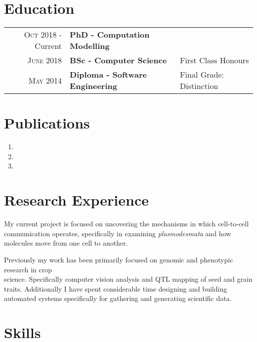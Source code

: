 \documentclass[a4paper,10pt]{article}
\begin{document}
\section{Education}
\begin{tabular}{rll}

  \textsc{Oct} 2018 - Current & \textbf{PhD - Computation Modelling} &   \\

  \textsc{June} 2018  & \textbf{BSc - Computer Science} & First Class Honours \\

  \textsc{May} 2014& \textbf{Diploma - Software Engineering} & Final Grade: Distinction

\end{tabular}


\section{Publications}

\begin{enumerate}
\item{}
\item{}
\item{}
\end{enumerate}



\section{Research Experience}

My current project is focused on uncovering the mechanisms in which cell-to-cell communication operates, specifically in examining \textit{plasmodesmata} and how molecules move from one cell to another.

Previously my work has been primarily focused on genomic and phenotypic research in crop \\science. Specifically computer vision analysis and QTL mapping of seed and grain traits. Additionally I have spent considerable time designing and building automated systems specifically for gathering and generating scientific data.


\section{Skills}
\end{document}
